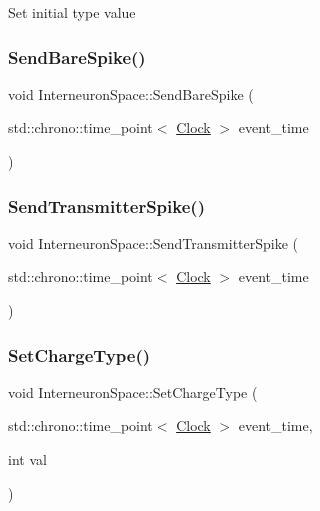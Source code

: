 Set initial type value \mbox{\label{classInterneuronSpace_ab56b0336c9e53f7b448e9d35e617e8c0}} 
\subsubsection{\texorpdfstring{Send\+Bare\+Spike()}{SendBareSpike()}}
{\footnotesize\ttfamily void Interneuron\+Space\+::\+Send\+Bare\+Spike (\begin{DoxyParamCaption}\item[{std\+::chrono\+::time\+\_\+point$<$ \mbox{\hyperlink{universe_8h_a0ef8d951d1ca5ab3cfaf7ab4c7a6fd80}{Clock}} $>$}]{event\+\_\+time }\end{DoxyParamCaption})}

\mbox{\label{classInterneuronSpace_a0a24da715aecafd4072d596fc271666f}} 
\subsubsection{\texorpdfstring{Send\+Transmitter\+Spike()}{SendTransmitterSpike()}}
{\footnotesize\ttfamily void Interneuron\+Space\+::\+Send\+Transmitter\+Spike (\begin{DoxyParamCaption}\item[{std\+::chrono\+::time\+\_\+point$<$ \mbox{\hyperlink{universe_8h_a0ef8d951d1ca5ab3cfaf7ab4c7a6fd80}{Clock}} $>$}]{event\+\_\+time }\end{DoxyParamCaption})}

\mbox{\label{classInterneuronSpace_a404aacb1adce30288bb7b4237344e4cc}} 
\subsubsection{\texorpdfstring{Set\+Charge\+Type()}{SetChargeType()}}
{\footnotesize\ttfamily void Interneuron\+Space\+::\+Set\+Charge\+Type (\begin{DoxyParamCaption}\item[{std\+::chrono\+::time\+\_\+point$<$ \mbox{\hyperlink{universe_8h_a0ef8d951d1ca5ab3cfaf7ab4c7a6fd80}{Clock}} $>$}]{event\+\_\+time,  }\item[{int}]{val }\end{DoxyParamCaption})\hspace{0.3cm}{\ttfamily [inline]}}

